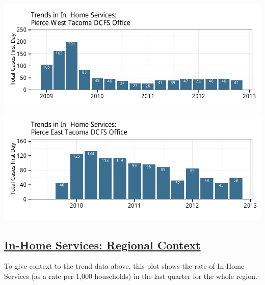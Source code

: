 \documentclass{article}\usepackage{graphicx, color}
\makeatletter
\def\maxwidth{ %
  \ifdim\Gin@nat@width>\linewidth
    \linewidth
  \else
    \Gin@nat@width
  \fi
}
\newenvironment{knitrout}{}{} %
\makeatother
\begin{document}
\begin{knitrout}
\color{fgcolor}

{\centering \includegraphics[width=\maxwidth]{figure/ihs_focus1} 
\includegraphics[width=\maxwidth]{figure/ihs_focus2} 

}



\end{knitrout}



\subsection{\href{http://www.partnersforourchildren.org/child-well-being/visualizations/home-services/trends}
    {In-Home Services: Regional Context}
}
To give context to the trend data above, this plot shows the rate of In-Home Services (as a rate per 1,000 households) in the last quarter for the whole region.
\end{document}
